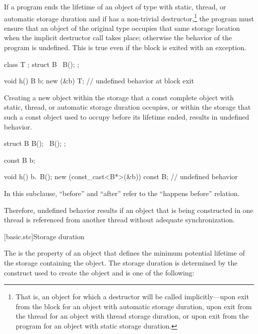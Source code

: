 \pnum
If a program ends the lifetime of an object of type  with
static, thread,
or automatic
storage duration and if  has a non-trivial destructor,\footnote{That
is, an object for which a destructor will be called
implicitly---upon exit from the block for an object with
automatic storage duration, upon exit from the thread for an object with
thread storage duration, or upon exit from the program for an object
with static storage duration.}
the program must ensure that an object of the original type occupies
that same storage location when the implicit destructor call takes
place; otherwise the behavior of the program is undefined. This is true
even if the block is exited with an exception. \begin{example}

\begin{codeblock}
class T { };
struct B {
   ~B();
};

void h() {
   B b;
   new (&b) T;
}                               // undefined behavior at block exit
\end{codeblock}
\end{example}

\pnum
Creating a new object within the storage that a const complete
object with static, thread, or automatic storage duration occupies,
or within the storage that such a const object used to occupy before
its lifetime ended, results in undefined behavior.
\begin{example}
\begin{codeblock}
struct B {
  B();
  ~B();
};

const B b;

void h() {
  b.~B();
  new (const_cast<B*>(&b)) const B;     // undefined behavior
}
\end{codeblock}
\end{example}

\pnum
In this subclause, ``before'' and ``after'' refer to the ``happens before''
relation. \begin{note} Therefore, undefined behavior results
if an object that is being constructed in one thread is referenced from another
thread without adequate synchronization. \end{note}%

[basic.stc]{Storage duration}

\pnum
{}%
The  is the property of an object that defines the minimum
potential lifetime of the storage containing the object. The storage
duration is determined by the construct used to create the object and is
one of the following:

